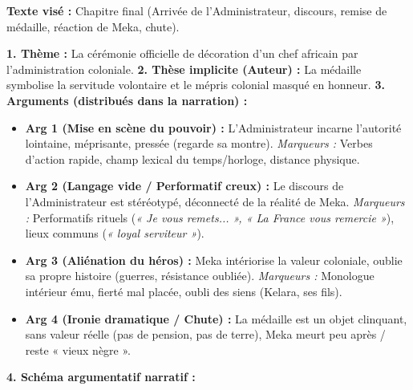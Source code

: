 \documentclass[11pt]{article}
\begin{document}
\begin{exoresolu}
\textbf{Texte visé :} Chapitre final (Arrivée de l'Administrateur, discours, remise de médaille, réaction de Meka, chute).

\textbf{1. Thème :} La cérémonie officielle de décoration d'un chef africain par l'administration coloniale.
\textbf{2. Thèse implicite (Auteur) :} La médaille symbolise la servitude volontaire et le mépris colonial masqué en honneur.
\textbf{3. Arguments (distribués dans la narration) :}
\begin{itemize}
    \item \textbf{Arg 1 (Mise en scène du pouvoir) :} L'Administrateur incarne l'autorité lointaine, méprisante, pressée (regarde sa montre). \emph{Marqueurs :} Verbes d'action rapide, champ lexical du temps/horloge, distance physique.
    \item \textbf{Arg 2 (Langage vide / Performatif creux) :} Le discours de l'Administrateur est stéréotypé, déconnecté de la réalité de Meka. \emph{Marqueurs :} Performatifs rituels (\emph{« Je vous remets... », « La France vous remercie »}), lieux communs (\emph{« loyal serviteur »}).
    \item \textbf{Arg 3 (Aliénation du héros) :} Meka intériorise la valeur coloniale, oublie sa propre histoire (guerres, résistance oubliée). \emph{Marqueurs :} Monologue intérieur ému, fierté mal placée, oubli des siens (Kelara, ses fils).
    \item \textbf{Arg 4 (Ironie dramatique / Chute) :} La médaille est un objet clinquant, sans valeur réelle (pas de pension, pas de terre), Meka meurt peu après / reste « vieux nègre ».
\end{itemize}
\textbf{4. Schéma argumentatif narratif :}
\begin{center}
\end{center}
\end{exoresolu}
\end{document}
